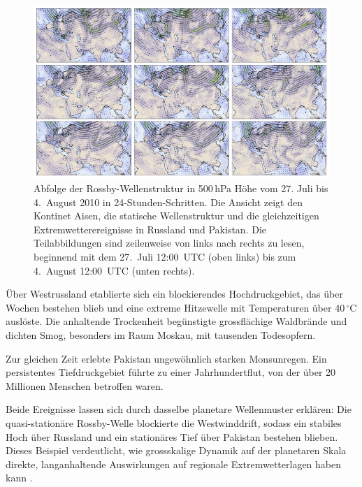 \begin{figure}
	\centering
	\includegraphics[width=\textwidth]{papers/rossby/images/rossby_2010.pdf}
	\caption{Abfolge der Rossby-Wellenstruktur in 500\,hPa Höhe vom 27. Juli bis 4.\ August 2010 in 24-Stunden-Schritten.
		Die Ansicht zeigt den Kontinet Aisen, die statische Wellenstruktur und die
		gleichzeitigen Extremwetterereignisse in Russland und Pakistan.
		Die Teilabbildungen sind zeilenweise von links nach rechts zu lesen, beginnend mit dem 27.\ Juli 12:00~UTC (oben links)
		bis zum 4.\ August 12:00~UTC (unten rechts).}
	\label{fig:rossby_grid_2010}
\end{figure}


Über Westrussland etablierte sich ein blockierendes Hochdruckgebiet, das über Wochen bestehen blieb und eine extreme Hitzewelle mit Temperaturen über 40\,$^\circ$C auslöste.
Die anhaltende Trockenheit begünstigte grossflächige Waldbrände und dichten Smog, besonders im Raum Moskau, mit tausenden Todesopfern.
%
%
%

Zur gleichen Zeit erlebte Pakistan ungewöhnlich starken Monsunregen. Ein
%
persistentes Tiefdruckgebiet führte zu einer Jahrhundertflut, von der über 20
%
Millionen Menschen betroffen waren.

Beide Ereignisse lassen sich durch dasselbe planetare Wellenmuster erklären:
Die quasi-stationäre Rossby-Welle blockierte die Westwinddrift, sodass ein
stabiles Hoch über Russland und ein stationäres Tief über Pakistan bestehen
blieben. Dieses Beispiel verdeutlicht, wie grossskalige Dynamik auf der
planetaren Skala direkte, langanhaltende Auswirkungen auf regionale
Extremwetterlagen haben kann \cite{rossby:petoukhov2013}.
